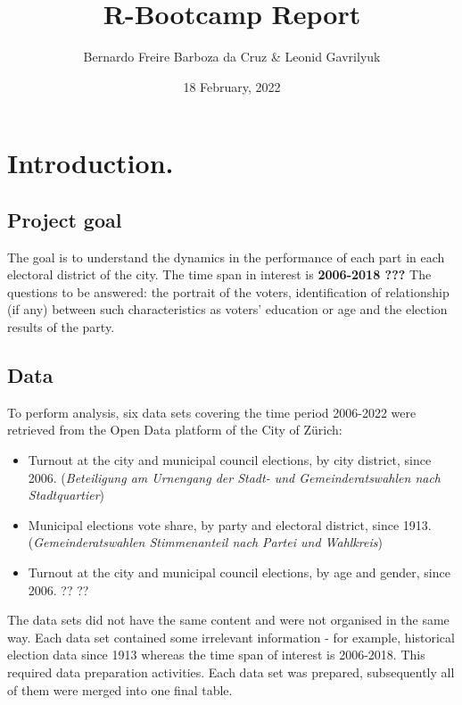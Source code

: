 \documentclass[
]{article}
\title{R-Bootcamp Report}
\author{Bernardo Freire Barboza da Cruz \& Leonid Gavrilyuk}
\date{18 February, 2022}
\providecommand{\tightlist}{%
  \setlength{\itemsep}{0pt}\setlength{\parskip}{0pt}}
\begin{document}
\maketitle

{
\setcounter{tocdepth}{4}
\tableofcontents
}
\pagebreak

\hypertarget{introduction.}{%
\section{Introduction.}\label{introduction.}}

\hypertarget{project-goal}{%
\subsection{Project goal}\label{project-goal}}

The goal is to understand the dynamics in the performance of each part
in each electoral district of the city. The time span in interest is
\textbf{2006-2018 ???} The questions to be answered: the portrait of the
voters, identification of relationship (if any) between such
characteristics as voters' education or age and the election results of
the party.

\hypertarget{data}{%
\subsection{Data}\label{data}}

To perform analysis, six data sets covering the time period 2006-2022
were retrieved from the Open Data platform of the City of Zürich:

\begin{itemize}
\tightlist
\item
  Turnout at the city and municipal council elections, by city district,
  since 2006. (\emph{Beteiligung am Urnengang der Stadt- und
  Gemeinderatswahlen nach Stadtquartier})
\item
  Municipal elections vote share, by party and electoral district, since
  1913. (\emph{Gemeinderatswahlen Stimmenanteil nach Partei und
  Wahlkreis})
\item
  Turnout at the city and municipal council elections, by age and
  gender, since 2006. ?? ??
\end{itemize}

The data sets did not have the same content and were not organised in
the same way. Each data set contained some irrelevant information - for
example, historical election data since 1913 whereas the time span of
interest is 2006-2018. This required data preparation activities. Each
data set was prepared, subsequently all of them were merged into one
final table.
\end{document}
